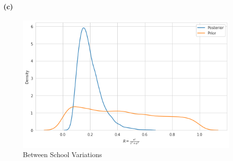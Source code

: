 \documentclass[11pt, letterpaper]{article}
\begin{document}
\newpage
\paragraph{(c)}
\begin{figure}[!h]
  \centering
  \includegraphics[width=1.0\textwidth]{3.c.png}
  \captionsetup{justification=centering}
  \caption{Between School Variations}
\end{figure}
\end{document}
